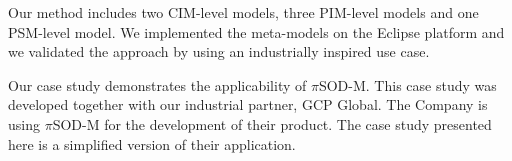 \documentclass[12pt,twoside]{article}
\theoremstyle{plain}
\theoremstyle{plain}
\newcommand{\pisodm}[0]{$\pi$SOD-M\xspace}
\begin{document}
\begin{multicols}{2}
Our method includes two CIM-level models, three PIM-level models and one PSM-level model.
We implemented the meta-models on the Eclipse platform and we validated the approach by using an industrially inspired use case.

Our case study demonstrates the applicability of \pisodm.
This case study was developed together with our industrial partner, GCP Global.
The Company is using \pisodm for the development of their product.
The case study presented here is a simplified version of their application. 




%
%



\end{multicols}
\end{document}
